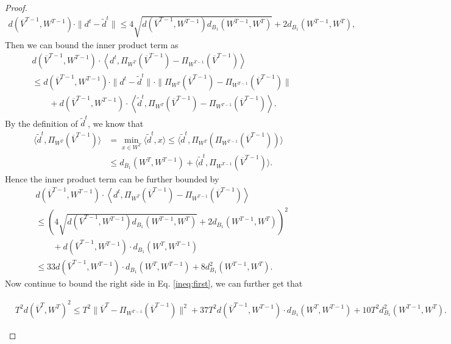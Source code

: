 \begin{proof}
\begin{align*}
    d(\overline{V}^{T-1}, W^{T-1})\cdot \|d^t - \tilde{d}^t\| \le 4\sqrt{d(\overline{V}^{T-1}, W^{T-1})d_{B_1}(W^{T-1}, W^T)} + 2d_{B_1}(W^{T-1}, W^T),
\end{align*}
Then we can bound the inner product term as 
\begin{align*}
    &d(\overline{V}^{T-1}, W^{T-1})\cdot \left\langle d^t,  \Pi_{W^T}(\overline{V}^{T-1}) - \Pi_{W^{T-1}}(\overline{V}^{T-1})\right\rangle\\
    &\le d(\overline{V}^{T-1}, W^{T-1})\cdot \|d^t - \tilde{d}^t\|\cdot \| \Pi_{W^T}(\overline{V}^{T-1}) - \Pi_{W^{T-1}}(\overline{V}^{T-1})\|\\
    &\qquad + d(\overline{V}^{T-1}, W^{T-1})\cdot \left\langle \tilde{d}^t,  \Pi_{W^T}(\overline{V}^{T-1}) - \Pi_{W^{T-1}}(\overline{V}^{T-1})\right\rangle.
\end{align*}
By the definition of $\tilde{d}^t$, we know that 
\begin{align*}
   \langle \tilde{d}^t,  \Pi_{W^T}(\overline{V}^{T-1})\rangle &= \min_{x \in W^T}\langle \tilde{d}^t, x\rangle \le \langle \tilde{d}^t, \Pi_{W^T}(\Pi_{W^{T-1}}(\overline{V}^{T-1}))\rangle \\
   &\le d_{B_1}(W^T, W^{T-1}) + \langle \tilde{d}^t, \Pi_{W^{T-1}}(\overline{V}^{T-1})\rangle .
\end{align*}
Hence the inner product term can be further bounded by  
\begin{align}
    &d(\overline{V}^{T-1}, W^{T-1})\cdot \left\langle d^t,  \Pi_{W^T}(\overline{V}^{T-1}) - \Pi_{W^{T-1}}(\overline{V}^{T-1})\right\rangle\nonumber\\
    &\le \left(4\sqrt{d(\overline{V}^{T-1}, W^{T-1})d_{B_1}(W^{T-1}, W^T)} + 2d_{B_1}(W^{T-1}, W^T) \right)^2\nonumber\\
    &\qquad + d(\overline{V}^{T-1}, W^{T-1})\cdot d_{B_1}(W^T, W^{T-1})\nonumber\\
    &\le 33d(\overline{V}^{T-1}, W^{T-1})\cdot d_{B_1}(W^T, W^{T-1}) + 8d^2_{B_1}(W^{T-1}, W^T).\label{eq:inner product estimate alpha}
\end{align}
Now continue to bound the right side in Eq. \eqref{ineq:first}, we can further get that
\begin{small}
\begin{align}
    &T^2d(\overline{V}^T, W^T)^2\le T^2\|\overline{V}^T - \Pi_{W^{T-1}}(\overline{V}^{T-1})\|^2 + 37T^2 d(\overline{V}^{T-1}, W^{T-1})\cdot d_{B_1}(W^T, W^{T-1}) + 10T^2 d^2_{B_1}(W^{T-1}, W^T).\label{ineq:second}
\end{align}

\end{small}
\end{proof}
